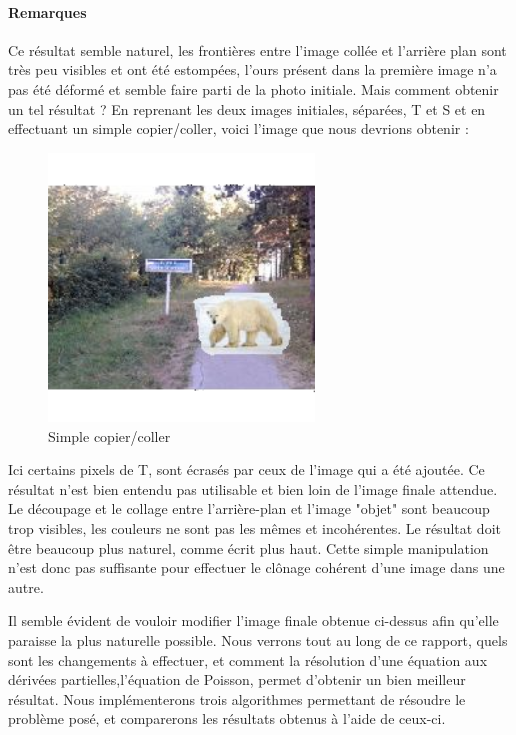 \paragraph{Remarques}
Ce résultat semble naturel, les frontières entre l'image collée et l'arrière plan sont très peu visibles et ont été estompées, l'ours présent dans la première image n'a pas été déformé et semble faire parti de la photo initiale. 
Mais comment obtenir un tel résultat ?
\newline
En reprenant les deux images initiales, séparées, T et S et en effectuant un simple copier/coller, voici l'image que nous devrions obtenir : 
\begin{center}
\begin{figure}[H]
     \centering
     \includegraphics[width = 200pt]{beamIm/cccv.png}
     \caption{Simple copier/coller}
\end{figure}
\end{center}
Ici certains pixels de T, sont écrasés par ceux de l'image qui a été ajoutée. Ce résultat n'est bien entendu pas utilisable et bien loin de l'image finale attendue. Le découpage et le collage entre l'arrière-plan et l'image "objet" sont beaucoup trop visibles, les couleurs ne sont pas les mêmes et incohérentes. Le résultat doit être beaucoup plus naturel, comme écrit plus haut. Cette simple manipulation n'est donc pas suffisante pour effectuer le clônage cohérent  d'une image dans une autre. \newline

Il semble évident de vouloir modifier l'image finale obtenue ci-dessus afin qu'elle paraisse la plus naturelle possible.
Nous verrons tout au long de ce rapport, quels sont les changements à effectuer, et comment la résolution d'une équation aux dérivées partielles,l'équation de Poisson, permet d'obtenir un bien meilleur résultat. Nous implémenterons trois algorithmes permettant de résoudre le problème posé, et comparerons les résultats obtenus à l'aide de ceux-ci.

